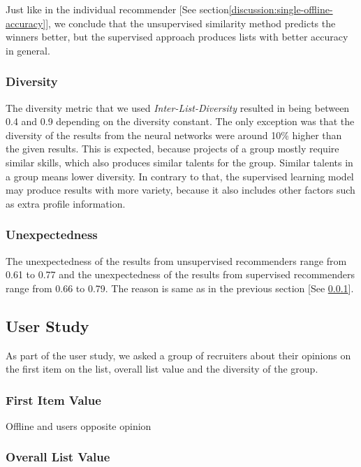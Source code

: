 Just like in the individual recommender [See section\ref{discussion:single-offline-accuracy}], we conclude that the unsupervised similarity method predicts the winners better, but the supervised approach produces lists with better accuracy in general.

\subsubsection{Diversity}\label{discussion:group-offline-diversity}

The diversity metric that we used \textit{Inter-List-Diversity} resulted in being between 0.4 and 0.9 depending on the diversity constant. The only exception was that the diversity of the results from the neural networks were around 10\% higher than the given results. This is expected, because projects of a group mostly require similar skills, which also produces similar talents for the group. Similar talents in a group means lower diversity. In contrary to that, the supervised learning model may produce results with more variety, because it also includes other factors such as extra profile information.

\subsubsection{Unexpectedness}

The unexpectedness of the results from unsupervised recommenders range from 0.61 to 0.77 and the unexpectedness of the results from supervised recommenders range from 0.66 to 0.79. The reason is same as in the previous section [See \ref{discussion:group-offline-diversity}].

\subsection{User Study}

As part of the user study, we asked a group of recruiters about their opinions on the first item on the list, overall list value and the diversity of the group.

\subsubsection{First Item Value}



Offline and users opposite opinion

\subsubsection{Overall List Value}

